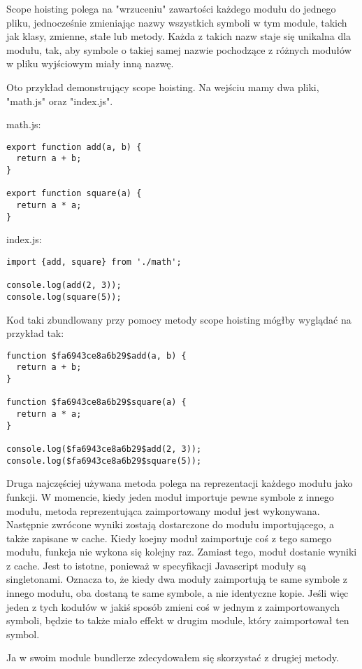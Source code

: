 \documentclass{SGGW-thesis}
\begin{document}
Scope hoisting polega na "wrzuceniu" zawartości każdego modułu do jednego pliku, jednocześnie zmieniając nazwy wszystkich symboli w tym module, takich jak klasy, zmienne, stałe lub metody. Każda z takich nazw staje się unikalna dla modułu, tak, aby symbole o takiej samej nazwie pochodzące z różnych modułów w pliku wyjściowym miały inną nazwę.

Oto przykład demonstrujący scope hoisting. Na wejściu mamy dwa pliki, "math.js" oraz "index.js".

math.js:
\begin{verbatim}
export function add(a, b) {
  return a + b;
}

export function square(a) {
  return a * a;
}
\end{verbatim}

index.js:
\begin{verbatim}
import {add, square} from './math';

console.log(add(2, 3));
console.log(square(5));
\end{verbatim}

Kod taki zbundlowany przy pomocy metody scope hoisting mógłby wyglądać na przykład tak:

\begin{verbatim}
function $fa6943ce8a6b29$add(a, b) {
  return a + b;
}

function $fa6943ce8a6b29$square(a) {
  return a * a;
}

console.log($fa6943ce8a6b29$add(2, 3));
console.log($fa6943ce8a6b29$square(5));
\end{verbatim}

Druga najczęściej używana metoda polega na reprezentacji każdego modułu jako funkcji. W momencie, kiedy jeden moduł importuje pewne symbole z innego modułu, metoda reprezentująca zaimportowany moduł jest wykonywana. Następnie zwrócone wyniki zostają dostarczone do modułu importującego, a także zapisane w cache. Kiedy koejny moduł zaimportuje coś z tego samego modułu, funkcja nie wykona się kolejny raz. Zamiast tego, moduł dostanie wyniki z cache. Jest to istotne, ponieważ w specyfikacji Javascript moduły są singletonami. Oznacza to, że kiedy dwa moduły zaimportują te same symbole z innego modułu, oba dostaną te same symbole, a nie identyczne kopie. Jeśli więc jeden z tych kodułów w jakiś sposób zmieni coś w jednym z zaimportowanych symboli, będzie to także miało effekt w drugim module, który zaimportował ten symbol.

Ja w swoim module bundlerze zdecydowałem się skorzystać z drugiej metody.
\end{document}

